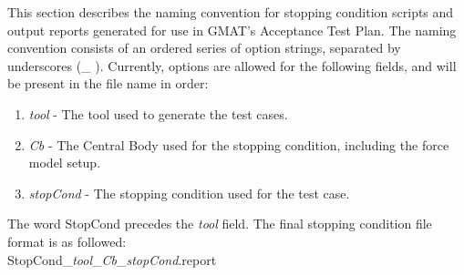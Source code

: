 This section describes the naming convention for stopping condition
scripts and output reports generated for use in GMAT's Acceptance
Test Plan. The naming convention consists of an ordered series of
option strings, separated by underscores (\_ ). Currently, options
are allowed for the following fields, and will be present in the
file name in order:
\begin{enumerate}
  \item \emph{tool} - The tool used to generate the test cases.
  \item \emph{Cb} - The Central Body used for the stopping
  condition, including the force model setup.
  \item \emph{stopCond} - The stopping condition used for the test
  case.
\end{enumerate}

The word StopCond precedes the \emph{tool} field. The final
stopping condition file format is as followed:\\
StopCond\_\emph{tool}\_\emph{Cb}\_\emph{stopCond}.report\\

